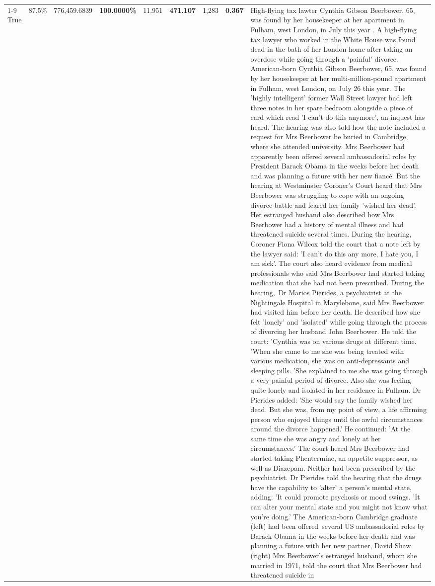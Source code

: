 \begin{table}[H]
\begin{tabular}{lllrlllll}
\cline{1-9}
True & 87.5\% & 776,459.6839 & \bfseries \color{red} 100.0000\% & 11.951 & \bfseries \color{red} 471.107 & 1,283 & \bfseries \color{red} 0.367 & High-flying tax lawter Cynthia Gibson Beerbower, 65, was found by her housekeeper at her apartment in Fulham, west London, in July this year . A high-flying tax lawyer who worked in the White House was found dead in the bath of her London home after taking an overdose while going through a 'painful' divorce. American-born Cynthia Gibson Beerbower, 65, was found by her housekeeper at her multi-million-pound apartment in Fulham, west London, on July 26 this year. The 'highly intelligent' former Wall Street lawyer had left three notes in her spare bedroom alongside a piece of card which read 'I can't do this anymore', an inquest has heard. The hearing was also told how the note included a request for Mrs Beerbower be buried in Cambridge, where she attended university. Mrs Beerbower had apparently been offered several ambassadorial roles by President Barack Obama in the weeks before her death and was planning a future with her new fiancé. But the hearing at Westminster Coroner's Court heard that Mrs Beerbower was struggling to cope with an ongoing divorce battle and feared her family 'wished her dead'. Her estranged husband also described how Mrs Beerbower had a history of mental illness and had threatened suicide several times. During the hearing, Coroner Fiona Wilcox told the court that a note left by the lawyer said: 'I can't do this any more, I hate you, I am sick'. The court also heard evidence from medical professionals who said Mrs Beerbower had started taking medication that she had not been prescribed. During the hearing, Dr Marios Pierides, a psychiatrist at the Nightingale Hospital in Marylebone, said Mrs Beerbower had visited him before her death. He described how she felt 'lonely' and 'isolated' while going through the process of divorcing her husband John Beerbower. He told the court: 'Cynthia was on various drugs at different time. 'When she came to me she was being treated with various medication, she was on anti-depressants and sleeping pills. 'She explained to me she was going through a very painful period of divorce. Also she was feeling quite lonely and isolated in her residence in Fulham. Dr Pierides added: 'She would say the family wished her dead. But she was, from my point of view, a life affirming person who enjoyed things until the awful circumstances around the divorce happened.' He continued: 'At the same time she was angry and lonely at her circumstances.' The court heard Mrs Beerbower had started taking Phentermine, an appetite suppressor, as well as Diazepam. Neither had been prescribed by the psychiatrist. Dr Pierides told the hearing that the drugs have the capability to 'alter' a person's mental state, adding: 'It could promote psychosis or mood swings. 'It can alter your mental state and you might not know what you're doing.' The American-born Cambridge graduate (left) had been offered several US ambassadorial roles by Barack Obama in the weeks before her death and was planning a future with her new partner, David Shaw (right) Mrs Beerbower's estranged husband, whom she married in 1971, told the court that Mrs Beerbower had threatened suicide in 
\end{tabular}
\end{table}
